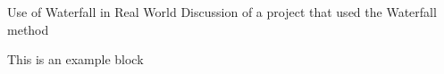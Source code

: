 \begin{frame}{Use of Waterfall in Real World}
Discussion of a project that used the Waterfall method
    \begin{exampleblock}{This is an example block}
        \lipsum[5][1-3]
    \end{exampleblock}
\end{frame}